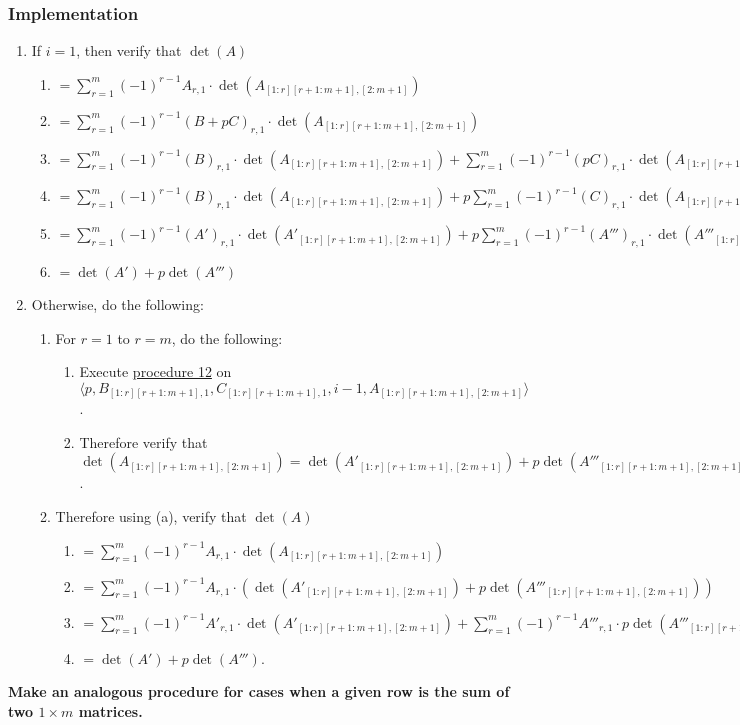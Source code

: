 \documentclass[twocolumn]{article}
\begin{document}
			\subsubsection{Implementation}
				\begin{enumerate}
					\item If $i=1$, then verify that $\det(A)$
					\begin{enumerate}
						\item $=\sum_{r=1}^m (-1)^{r-1}A_{r,1}\cdot\det(A_{[1:r][r+1:m+1],[2:m+1]})$
						\item $=\sum_{r=1}^m (-1)^{r-1}(B+pC)_{r,1}\cdot\det(A_{[1:r][r+1:m+1],[2:m+1]})$
						\item $=\sum_{r=1}^m (-1)^{r-1}(B)_{r,1}\cdot\det(A_{[1:r][r+1:m+1],[2:m+1]})+\sum_{r=1}^m (-1)^{r-1}(pC)_{r,1}\cdot\det(A_{[1:r][r+1:m+1],[2:m+1]})$
						\item $=\sum_{r=1}^m (-1)^{r-1}(B)_{r,1}\cdot\det(A_{[1:r][r+1:m+1],[2:m+1]})+p\sum_{r=1}^m (-1)^{r-1}(C)_{r,1}\cdot\det(A_{[1:r][r+1:m+1],[2:m+1]})$
						\item $=\sum_{r=1}^m (-1)^{r-1}(A')_{r,1}\cdot\det(A'_{[1:r][r+1:m+1],[2:m+1]})+p\sum_{r=1}^m (-1)^{r-1}(A''')_{r,1}\cdot\det(A'''_{[1:r][r+1:m+1],[2:m+1]})$
						\item $=\det(A')+p\det(A''')$
					\end{enumerate}
					\item Otherwise, do the following:
					\begin{enumerate}
						\item For $r=1$ to $r=m$, do the following:
						\begin{enumerate}
							\item Execute \hyperref[sec:procedure 12]{procedure 12} on $\langle p,B_{[1:r][r+1:m+1],1},C_{[1:r][r+1:m+1],1},i-1,\allowbreak A_{[1:r][r+1:m+1],[2:m+1]}\rangle$.
							\item Therefore verify that $\det(A_{[1:r][r+1:m+1],[2:m+1]})=\det(A'_{[1:r][r+1:m+1],[2:m+1]})+p\det(A'''_{[1:r][r+1:m+1],[2:m+1]})$.
						\end{enumerate}
						\item Therefore using (a), verify that $\det(A)$
						\begin{enumerate}
							\item $=\sum_{r=1}^m (-1)^{r-1}A_{r,1}\cdot\det(A_{[1:r][r+1:m+1],[2:m+1]})$
							\item $=\sum_{r=1}^m (-1)^{r-1}A_{r,1}\cdot(\det(A'_{[1:r][r+1:m+1],[2:m+1]})+p\det(A'''_{[1:r][r+1:m+1],[2:m+1]}))$
							\item $=\sum_{r=1}^m (-1)^{r-1}A'_{r,1}\cdot\det(A'_{[1:r][r+1:m+1],[2:m+1]})+\sum_{r=1}^m (-1)^{r-1}A'''_{r,1}\cdot p\det(A'''_{[1:r][r+1:m+1],[2:m+1]})$
							\item $=\det(A')+p\det(A''')$.
						\end{enumerate}
					\end{enumerate}
				\end{enumerate}
			\textbf{Make an analogous procedure for cases when a given row is the sum of two $1\times m$ matrices.}
\end{document}
